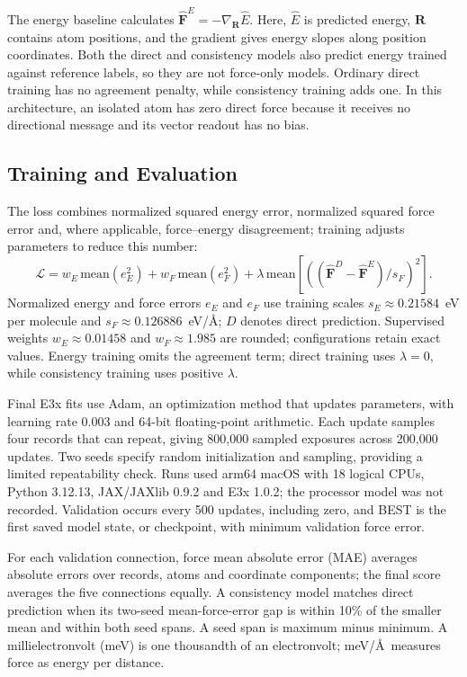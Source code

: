 \documentclass{article}
\begin{document}
The energy baseline calculates $\widehat{\mathbf F}^{E}=-\nabla_{\mathbf R}\widehat E$. Here, $\widehat E$ is predicted energy, $\mathbf R$ contains atom positions, and the gradient gives energy slopes along position coordinates. Both the direct and consistency models also predict energy trained against reference labels, so they are not force-only models. Ordinary direct training has no agreement penalty, while consistency training adds one. In this architecture, an isolated atom has zero direct force because it receives no directional message and its vector readout has no bias.
\subsection{Training and Evaluation}\label{sec:training}
The loss combines normalized squared energy error, normalized squared force error and, where applicable, force--energy disagreement; training adjusts parameters to reduce this number:
\begin{equation}
\mathcal L=w_E\,\mathrm{mean}(e_E^2)+w_F\,\mathrm{mean}(e_F^2)
+\lambda\,\mathrm{mean}\!\left[\left((\widehat{\mathbf F}^{D}-\widehat{\mathbf F}^{E})/s_F\right)^2\right].
\end{equation}
Normalized energy and force errors $e_E$ and $e_F$ use training scales $s_E\approx0.21584$~eV per molecule and $s_F\approx0.126886$~eV/\AA; $D$ denotes direct prediction. Supervised weights $w_E\approx0.01458$ and $w_F\approx1.985$ are rounded; configurations retain exact values. Energy training omits the agreement term; direct training uses $\lambda=0$, while consistency training uses positive $\lambda$.

Final E3x fits use Adam, an optimization method that updates parameters, with learning rate 0.003 and 64-bit floating-point arithmetic. Each update samples four records that can repeat, giving 800,000 sampled exposures across 200,000 updates. Two seeds specify random initialization and sampling, providing a limited repeatability check. Runs used arm64 macOS with 18 logical CPUs, Python 3.12.13, JAX/JAXlib 0.9.2 and E3x 1.0.2; the processor model was not recorded. Validation occurs every 500 updates, including zero, and BEST is the first saved model state, or checkpoint, with minimum validation force error.

For each validation connection, force mean absolute error (MAE) averages absolute errors over records, atoms and coordinate components; the final score averages the five connections equally. A consistency model matches direct prediction when its two-seed mean-force-error gap is within 10\% of the smaller mean and within both seed spans. A seed span is maximum minus minimum. A millielectronvolt (meV) is one thousandth of an electronvolt; meV/\AA\ measures force as energy per distance.
\end{document}
